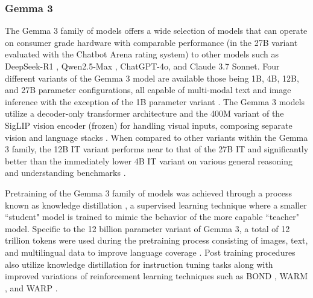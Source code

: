 \subsubsection{Gemma 3}
The Gemma 3 family of models \cite{team_gemma_2025} offers a wide selection of
models that can operate on consumer grade hardware with comparable performance
(in the 27B variant evaluated with the Chatbot Arena \cite{chiang_chatbot_2024}
rating system) to other models such as DeepSeek-R1
\cite{deepseek-ai_deepseek-r1_2025}, Qwen2.5-Max \cite{qwen_qwen25_2025},
ChatGPT-4o, and Claude 3.7 Sonnet. Four different variants of the Gemma 3 model
are available those being 1B, 4B, 12B, and 27B parameter configurations, all
capable of multi-modal text and image inference with the exception of the 1B
parameter variant \cite{team_gemma_2025}. The Gemma 3 models utilize a
decoder-only transformer architecture and the 400M variant of the SigLIP vision
encoder (frozen) \cite{zhai_sigmoid_2023} for handling visual inputs, composing
separate vision and language stacks \cite{team_gemma_2025}. When compared to other
variants within the Gemma 3 family, the 12B IT variant performs near to that of
the 27B IT and significantly better than the immediately lower 4B IT variant on
various general reasoning and understanding benchmarks \cite{team_gemma_2025,
wang_mmlu-pro_2024, jain_livecodebench_2024, rein_gpqa_2023, wei_measuring_2024,
singh_global_2025, yue_mmmu_2024}.

Pretraining of the Gemma 3 family of models was achieved through a process known
as knowledge distillation \cite{hinton_distilling_2015}, a supervised learning
technique where a smaller ``student" model is trained to mimic the behavior of
the more capable ``teacher" model. Specific to the 12 billion parameter variant
of Gemma 3, a total of 12 trillion tokens were used during the pretraining
process consisting of images, text, and multilingual data to improve language
coverage \cite{team_gemma_2025}. Post training procedures also utilize knowledge
distillation for instruction tuning tasks along with improved variations of
reinforcement learning techniques such as BOND \cite{sessa_bond_2024}, WARM
\cite{rame_warm_2024}, and WARP \cite{rame_warp_2024}.

